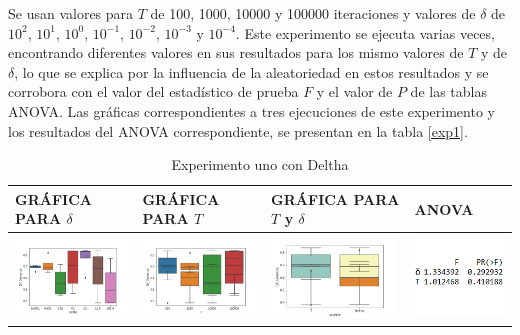 Se usan valores para $T$ de 100, 1000, 10000 y 100000 iteraciones y valores de $\delta$ de $10^{2}$, $10^{1}$, $10^{0}$, $10^{-1}$, $10^{-2}$, $10^{-3}$ y $10^{-4}$. Este experimento se ejecuta varias veces, encontrando diferentes valores en sus resultados para los mismo valores de $T$ y de $\delta$, lo que se explica por la influencia de la aleatoriedad en estos resultados y se corrobora con el valor del estadístico de prueba $F$ y el valor de $P$ de las tablas ANOVA. Las gráficas correspondientes a tres ejecuciones de este experimento y los resultados del ANOVA correspondiente, se presentan en la tabla \ref{exp1}.
\begin{table}[H]
\caption{Experimento uno con Deltha}
\centering
\begin{tabular}[c]{llll}
\multicolumn{1}{p{2.9cm}}{\textbf{GRÁFICA PARA $\delta$}} & \multicolumn{1}{p{2.9cm}}{\textbf{GRÁFICA PARA $T$}} & \multicolumn{1}{p{2.9cm}}{\textbf{GRÁFICA PARA $T$ y $\delta$}} & \multicolumn{1}{p{2.9cm}}{\textbf{ANOVA}}  \\ \hline
\multicolumn{1}{|l|}{\includegraphics[align=t, width=33mm]{cajasDeltha_exp11.jpg}}    & \multicolumn{1}{l|}{\includegraphics[align=t, width=33mm]{cajasT1_exp11.jpg} } & \multicolumn{1}{l|}{\includegraphics[align=t, width=33mm]{cajasT_Deltha_exp11.jpg} } &
\multicolumn{1}{p{3cm}|}{\includegraphics[align=t, width=30mm]{Anova11.png}}     \\ \hline

\end{tabular}
\end{table}
